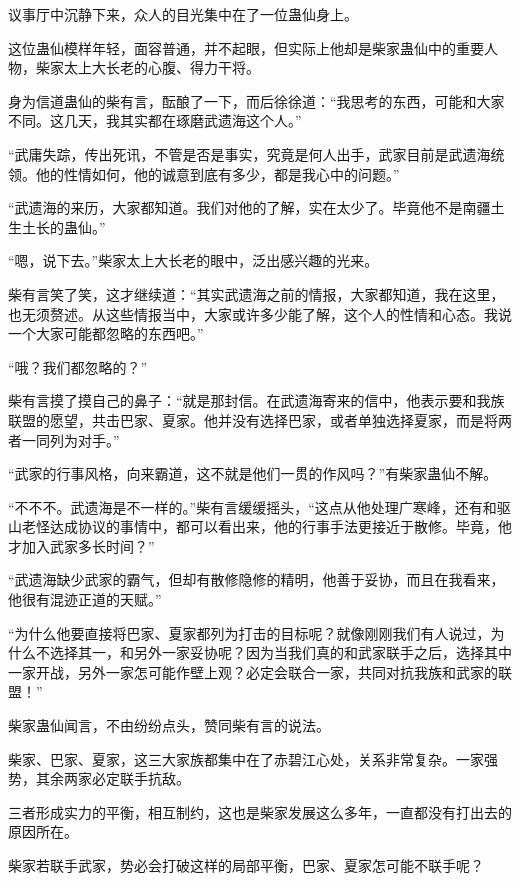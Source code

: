 
\begin{this_body}

议事厅中沉静下来，众人的目光集中在了一位蛊仙身上。

这位蛊仙模样年轻，面容普通，并不起眼，但实际上他却是柴家蛊仙中的重要人物，柴家太上大长老的心腹、得力干将。

身为信道蛊仙的柴有言，酝酿了一下，而后徐徐道：“我思考的东西，可能和大家不同。这几天，我其实都在琢磨武遗海这个人。”

“武庸失踪，传出死讯，不管是否是事实，究竟是何人出手，武家目前是武遗海统领。他的性情如何，他的诚意到底有多少，都是我心中的问题。”

“武遗海的来历，大家都知道。我们对他的了解，实在太少了。毕竟他不是南疆土生土长的蛊仙。”

“嗯，说下去。”柴家太上大长老的眼中，泛出感兴趣的光来。

柴有言笑了笑，这才继续道：“其实武遗海之前的情报，大家都知道，我在这里，也无须赘述。从这些情报当中，大家或许多少能了解，这个人的性情和心态。我说一个大家可能都忽略的东西吧。”

“哦？我们都忽略的？”

柴有言摸了摸自己的鼻子：“就是那封信。在武遗海寄来的信中，他表示要和我族联盟的愿望，共击巴家、夏家。他并没有选择巴家，或者单独选择夏家，而是将两者一同列为对手。”

“武家的行事风格，向来霸道，这不就是他们一贯的作风吗？”有柴家蛊仙不解。

“不不不。武遗海是不一样的。”柴有言缓缓摇头，“这点从他处理广寒峰，还有和驱山老怪达成协议的事情中，都可以看出来，他的行事手法更接近于散修。毕竟，他才加入武家多长时间？”

“武遗海缺少武家的霸气，但却有散修隐修的精明，他善于妥协，而且在我看来，他很有混迹正道的天赋。”

“为什么他要直接将巴家、夏家都列为打击的目标呢？就像刚刚我们有人说过，为什么不选择其一，和另外一家妥协呢？因为当我们真的和武家联手之后，选择其中一家开战，另外一家怎可能作壁上观？必定会联合一家，共同对抗我族和武家的联盟！”

柴家蛊仙闻言，不由纷纷点头，赞同柴有言的说法。

柴家、巴家、夏家，这三大家族都集中在了赤碧江心处，关系非常复杂。一家强势，其余两家必定联手抗敌。

三者形成实力的平衡，相互制约，这也是柴家发展这么多年，一直都没有打出去的原因所在。

柴家若联手武家，势必会打破这样的局部平衡，巴家、夏家怎可能不联手呢？


\end{this_body}
